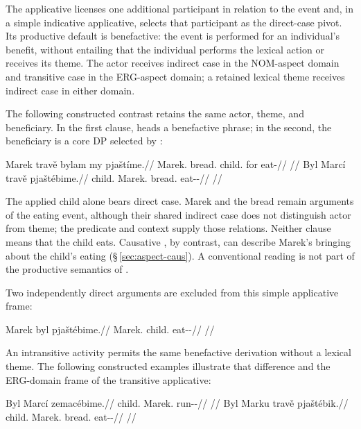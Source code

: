 The applicative  licenses one additional participant in relation to
the event and, in a simple indicative applicative, selects that participant as
the direct-case pivot. Its productive default is benefactive: the event is
performed for an individual's benefit, without entailing that the individual
performs the lexical action or receives its theme. The actor receives indirect
case in the NOM-aspect domain and transitive case in the ERG-aspect domain;
a retained lexical theme receives indirect case in either domain.

The following constructed contrast retains the same actor, theme, and
beneficiary. In the first clause,  heads a benefactive phrase; in the
second, the beneficiary is a core DP selected by :

\pex\label{ex:val-appl-transitive}
\a
\begingl
\gla Marek travě bylam my pjaštíme.//
\glb Marek.\Dir{} bread.\Ind{} child.\Ind{} for eat-\Prog{}//
\glft {}//
\endgl
\a
\begingl
\gla Byl Marcí travě pjaštébime.//
\glb child.\Dir{} Marek.\Ind{} bread.\Ind{} eat-\Appl{}-\Prog{}//
\glft {}//
\endgl
\xe

The applied child alone bears direct case. Marek and the bread remain arguments
of the eating event, although their shared indirect case does not distinguish
actor from theme; the predicate and context supply those relations. Neither
clause means that the child eats. Causative , by contrast,
can describe Marek's bringing about the child's eating
(§\,\ref{sec:aspect-caus}). A conventional  reading is not part of
the productive semantics of .

Two independently direct arguments are excluded from this simple applicative
frame:

\ex
\begingl
\gla *Marek byl pjaštébime.//
\glb Marek.\Dir{} child.\Dir{} eat-\Appl{}-\Prog{}//
\glft {}//
\endgl
\xe

An intransitive activity permits the same benefactive derivation without a
lexical theme. The following constructed examples illustrate that difference
and the ERG-domain frame of the transitive applicative:

\pex\label{ex:val-appl-ergative}
\a
\begingl
\gla Byl Marcí zemacébime.//
\glb child.\Dir{} Marek.\Ind{} run-\Appl{}-\Prog{}//
\glft {}//
\endgl
\a
\begingl
\gla Byl Marku travě pjaštébik.//
\glb child.\Dir{} Marek.\Trs{} bread.\Ind{} eat-\Appl{}-\Pf{}//
\glft {}//
\endgl
\xe

